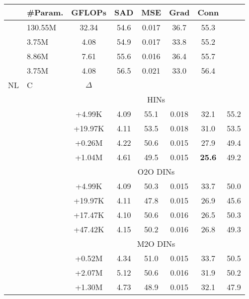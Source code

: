 \documentclass[10pt,twocolumn,letterpaper]{article}
\begin{document}
\begin{table}[!t] \footnotesize
	\captionsetup{font=small,singlelinecheck=true}
	\centering
\renewcommand\arraystretch{1.0}
\begin{tabular}{>{\centering}p{.3cm}|>{\centering}p{.3cm}|c|c|c|c|c|c}
			\hline
			\multicolumn{2}{c|}{Method} 				& \#Param. & GFLOPs & SAD & MSE & Grad & Conn\\
			\hline
			\multicolumn{2}{l|}{B3~\cite{xu2017deep}} 	& 130.55M & 32.34 & 54.6 & 0.017 & 36.7 & 55.3 \\
			\multicolumn{2}{l|}{B11} 					& 3.75M	  & 4.08  & 54.9 & 0.017 & 33.8 & 55.2 \\
			\multicolumn{2}{l|}{B11-1.4} 				& 8.86M	  & 7.61  & 55.6 & 0.016 & 36.4 & 55.7 \\
			\multicolumn{2}{l|}{HMI} 					& 3.75M   & 4.08  & 56.5 & 0.021 & 33.0 & 56.4 \\
			\hline
			NL & C & $\Delta$ \\
			\hline
			& & \multicolumn{6}{c}{HINs}\\
			\hline
			& 									 		& +4.99K  & 4.09  & 55.1 & 0.018 & 32.1 & 55.2\\
			& \checkmark                                & +19.97K & 4.11  & 53.5 & 0.018 & 31.0 & 53.5\\
			\checkmark & 						 		& +0.26M  & 4.22  & 50.6 & 0.015 & 27.9 & 49.4\\
			\checkmark & \checkmark 			 		& +1.04M  & 4.61  & 49.5 & 0.015 & \textbf{25.6} & 49.2\\
			\hline
			& & \multicolumn{6}{c}{O2O DINs}\\
			\hline
			&          					                & +4.99K  & 4.09  & 50.3 & 0.015 & 33.7 & 50.0\\
			& \checkmark                                & +19.97K & 4.11  & 47.8 & 0.015 & 26.9 & 45.6\\
			\checkmark &            	                & +17.47K & 4.10  & 50.6 & 0.016 & 26.5 & 50.3\\
			\checkmark & \checkmark 	                & +47.42K & 4.15  & 50.2 & 0.016 & 26.8 & 49.3\\
			\hline
			& & \multicolumn{6}{c}{M2O DINs}\\
			\hline
			&          				             		& +0.52M & 4.34   & 51.0 & 0.015 & 33.7 & 50.5\\
			& \checkmark                                & +2.07M & 5.12   & 50.6 & 0.016 & 31.9 & 50.2\\
			\checkmark &                         		& +1.30M & 4.73   & 48.9 & 0.015 & 32.1 & 47.9\\

\end{tabular}
\end{table}
\end{document}
